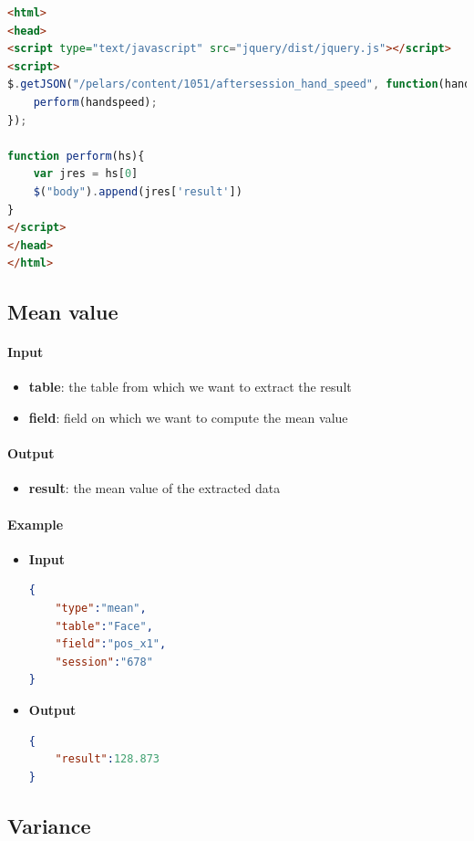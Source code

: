 \documentclass[a4paper,notitlepage,onecolumn]{hitec}  %
\begin{document}
\begin{lstlisting}[language=html]
<html>
<head>
<script type="text/javascript" src="jquery/dist/jquery.js"></script>
<script>
$.getJSON("/pelars/content/1051/aftersession_hand_speed", function(handspeed) {
	perform(handspeed);
});

function perform(hs){
	var jres = hs[0]
	$("body").append(jres['result'])
}
</script>
</head>
</html>
\end{lstlisting}


\subsection{Mean value}

\paragraph{Input}
\begin{itemize}
\item\textbf{table}: the table from which we want to extract the result
\item\textbf{field}: field on which we want to compute the mean value
\end{itemize}

\paragraph{Output}
\begin{itemize}
\item\textbf{result}: the mean value of the extracted data
\end{itemize}

\paragraph{Example}
\begin{itemize}
\item\textbf{Input}
\begin{lstlisting}[language=json,firstnumber=1]
{  
	"type":"mean",
	"table":"Face",
	"field":"pos_x1",
	"session":"678"
}
\end{lstlisting}
\item\textbf{Output}
\begin{lstlisting}[language=json,firstnumber=1]
{  
	"result":128.873
}
\end{lstlisting}
\end{itemize}

\subsection{Variance}
\end{document}
